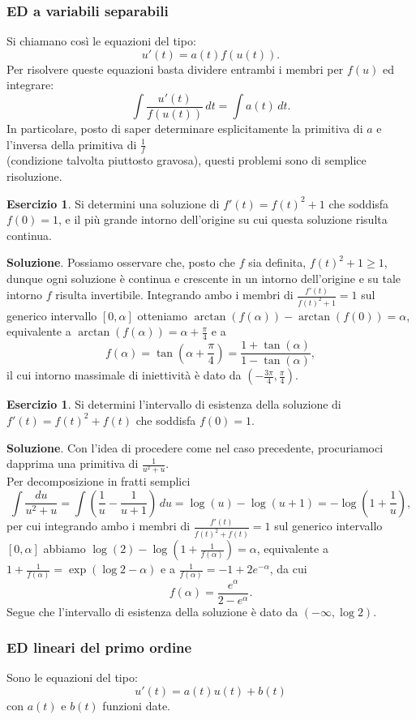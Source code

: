 \documentclass[a4paper,twoside]{article}
\theoremstyle{definition}
\newtheorem{ex}[theorem]{Esercizio}
\numberwithin{theorem}{section}
\begin{document}
\subsubsection{ED a variabili separabili}
Si chiamano così le equazioni del tipo: $$u'(t)=a(t)f(u(t)).$$ 
Per risolvere queste equazioni basta dividere entrambi i membri per $f(u)$ ed integrare: $$\int\frac{u'(t)}{f(u(t))}\,dt=\int a(t)\,dt.$$
In particolare, posto di saper determinare esplicitamente la primitiva di $a$ e  l'inversa della primitiva di $\frac{1}{f}$\\ (condizione talvolta piuttosto gravosa), questi problemi sono di semplice risoluzione.

\begin{ex} Si determini una soluzione di $f'(t)=f(t)^2+1$ che soddisfa $f(0)=1$, e il più grande intorno dell'origine su cui questa soluzione risulta continua. 
\end{ex}
\textbf{Soluzione}. Possiamo osservare che, posto che $f$ sia definita, $f(t)^2+1\geq 1$, dunque ogni soluzione è continua e crescente in un intorno dell'origine e su tale intorno $f$ risulta invertibile. Integrando ambo i membri di $\frac{f'(t)}{f(t)^2+1}=1$ sul generico intervallo $[0,\alpha]$ otteniamo $\arctan(f(\alpha))-\arctan(f(0))=\alpha$, equivalente a $\arctan(f(\alpha))=\alpha+\frac{\pi}{4}$ e a
$$ f(\alpha)=\tan\left(\alpha+\frac{\pi}{4}\right)=\frac{1+\tan(\alpha)}{1-\tan(\alpha)},$$
il cui intorno massimale di iniettività è dato da $\left(-\frac{3\pi}{4},\frac{\pi}{4}\right)$.

\begin{ex} Si determini l'intervallo di esistenza della soluzione di $f'(t)=f(t)^2+f(t)$ che soddisfa $f(0)=1$. 
\end{ex}
\textbf{Soluzione}. Con l'idea di procedere come nel caso precedente, procuriamoci dapprima una primitiva di $\frac{1}{u^2+u}$.\\ Per decomposizione in fratti semplici 
$$ \int \frac{du}{u^2+u} = \int\left(\frac{1}{u}-\frac{1}{u+1}\right)\,du = \log(u)-\log(u+1) = -\log\left(1+\frac{1}{u}\right), $$
per cui integrando ambo i membri di $\frac{f'(t)}{f(t)^2+f(t)}=1$ sul generico intervallo $[0,\alpha]$ abbiamo $\log(2)-\log\left(1+\frac{1}{f(\alpha)}\right)=\alpha$, equivalente a $1+\frac{1}{f(\alpha)}=\exp\left(\log 2-\alpha\right)$ e a $\frac{1}{f(\alpha)}=-1+2 e^{-\alpha}$, da cui 
$$ f(\alpha) = \frac{e^{\alpha}}{2-e^{\alpha}}. $$
Segue che l'intervallo di esistenza della soluzione è dato da $(-\infty,\log 2)$.

\subsubsection{ED lineari del primo ordine}
Sono le equazioni del tipo: $$u'(t)=a(t)u(t)+b(t)$$
con $a(t)$ e $b(t)$ funzioni date.
\end{document}
